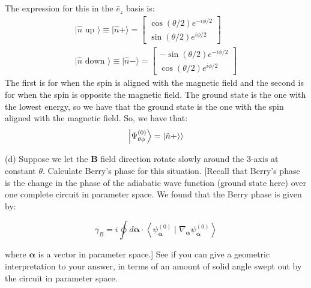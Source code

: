 \documentclass[12pt]{article}
\begin{document}
\subsection{}
The expression for this in the $\hat{e}_{z}$ basis is:
\begin{equation}
\begin{gathered}
\mid \hat{n} \text { up }\rangle \equiv|\hat{n}+\rangle=\left[\begin{array}{c}
\cos (\theta / 2) e^{-i \phi / 2} \\
\sin (\theta / 2) e^{i \phi / 2}
\end{array}\right] \\
\mid \hat{n} \text { down }\rangle \equiv|\hat{n}-\rangle=\left[\begin{array}{c}
-\sin (\theta / 2) e^{-i \phi / 2} \\
\cos (\theta / 2) e^{i \phi / 2}
\end{array}\right]
\end{gathered}
\end{equation}
The first is for when the spin is aligned with the magnetic field and the second is for when the spin is opposite the magnetic field. The ground state is the one with the lowest energy, so we have that the ground state is the one with the spin aligned with the magnetic field. So, we have that:
\begin{equation}
  \ket{\Psi _{\theta \phi}^{(0)}} = \ket{\hat{n}+\rangle}
\end{equation}

(d) Suppose we let the $\mathbf{B}$ field direction rotate slowly around the 3-axis at constant $\theta$. Calculate Berry's phase for this situation. [Recall that Berry's phase is the change in the phase of the adiabatic wave function (ground state here) over one complete circuit in parameter space. We found that the Berry phase is given by:


\begin{equation*}
\gamma_{B}=i \oint d \boldsymbol{\alpha} \cdot\left\langle\psi_{\boldsymbol{\alpha}}^{(0)} \mid \nabla_{\boldsymbol{\alpha}} \psi_{\boldsymbol{\alpha}}^{(0)}\right\rangle \tag{4}
\end{equation*}


where $\boldsymbol{\alpha}$ is a vector in parameter space.] See if you can give a geometric interpretation to your answer, in terms of an amount of solid angle swept out by the circuit in parameter space.
\end{document}
